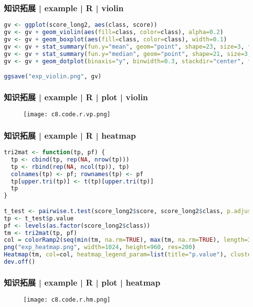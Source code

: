 \begin{frame}[fragile]
  \frametitle{知识拓展 | example | R | violin}
\begin{lstlisting}[language=r]
gv <- ggplot(score_long2, aes(class, score))
gv <- gv + geom_violin(aes(fill=class, color=class), alpha=0.2)
gv <- gv + geom_boxplot(aes(fill=class, color=class), width=0.1)
gv <- gv + stat_summary(fun.y="mean", geom="point", shape=23, size=3, fill="red")
gv <- gv + stat_summary(fun.y="median", geom="point", shape=21, size=3, fill="blue")
gv <- gv + geom_dotplot(binaxis="y", binwidth=0.3, stackdir="center", fill=NA)

ggsave("exp_violin.png", gv)
\end{lstlisting}
\end{frame}

\begin{frame}
  \frametitle{知识拓展 | example | R | plot | violin}
  \begin{figure}
    \centering
    \texttt{[image: c8.code.r.vp.png]}
  \end{figure}
\end{frame}

\begin{frame}[fragile]
  \frametitle{知识拓展 | example | R | heatmap}
\begin{lstlisting}[language=r,basicstyle=\footnotesize\tt,numberstyle=\scriptsize]
tri2mat <- function(tp, pf) {
  tp <- cbind(tp, rep(NA, nrow(tp)))
  tp <- rbind(rep(NA, ncol(tp)), tp)
  colnames(tp) <- pf; rownames(tp) <- pf
  tp[upper.tri(tp)] <- t(tp)[upper.tri(tp)]
  tp
}

t_test <- pairwise.t.test(score_long2$score, score_long2$class, p.adjust.method="none", pool.sd=FALSE)
tp <- t_test$p.value
pf <- levels(as.factor(score_long2$class))
tm <- tri2mat(tp, pf)
col = colorRamp2(seq(min(tm, na.rm=TRUE), max(tm, na.rm=TRUE), length=3), c("red", "#EEEEEE", "blue"), space="RGB")
png("exp_heatmap.png", width=1024, height=960, res=200)
Heatmap(tm, col=col, heatmap_legend_param=list(title="p.value"), cluster_rows=FALSE, cluster_columns=FALSE)
dev.off()
\end{lstlisting}
\end{frame}

\begin{frame}
  \frametitle{知识拓展 | example | R | plot | heatmap}
  \begin{figure}
    \centering
    \texttt{[image: c8.code.r.hm.png]}
  \end{figure}
\end{frame}

